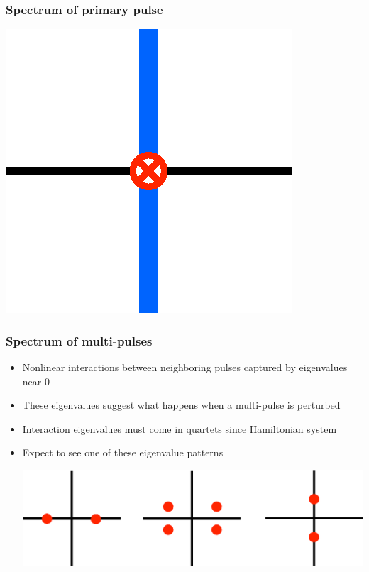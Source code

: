 \documentclass[16pt]{beamer}
\begin{document}
\begin{frame}
	\frametitle{Spectrum of primary pulse}
		\begin{center}
			\includegraphics[width=0.4\linewidth]{images/eigsinglepulse.eps}
		\end{center}
\end{frame}

\begin{frame}
	\frametitle{Spectrum of multi-pulses}
	\fontsize{16}{7.2}\selectfont
	\begin{itemize}
	\item Nonlinear interactions between neighboring pulses captured by eigenvalues near 0
	\vspace{0.25cm} 
	\item These eigenvalues suggest what happens when a multi-pulse is perturbed
	\vspace{0.25cm} 
	\item Interaction eigenvalues must come in quartets since Hamiltonian system
	\vspace{0.25cm}
	\item Expect to see one of these eigenvalue patterns
		\begin{center}
			\includegraphics[width=0.6\linewidth]{images/eigdouble2}
		\end{center}
	\end{itemize}
\end{frame}
\end{document}
